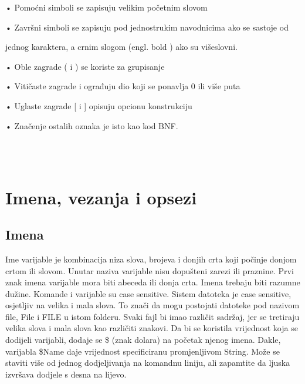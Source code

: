 \documentclass[11pt]{book}
\begin{document}
• Pomoćni simboli se zapisuju velikim početnim slovom

• Završni simboli se zapisuju pod jednostrukim navodnicima ako se sastoje od

jednog karaktera, a crnim slogom (engl. bold ) ako su višeslovni. 

• Oble zagrade ( i ) se koriste za grupisanje

• Vitičaste zagrade { i } ograđuju dio koji se ponavlja 0 ili više puta

• Uglaste zagrade [ i ] opisuju opcionu konstrukciju

• Značenje ostalih oznaka je isto kao kod BNF.\\\\

\\


\section{Imena, vezanja i opsezi}

\subsection{Imena}
Ime varijable je kombinacija niza slova, brojeva i donjih crta koji počinje donjom crtom ili slovom. 
Unutar naziva varijable nisu dopušteni zarezi ili praznine. Prvi znak imena varijable mora biti abeceda ili donja crta. Imena trebaju biti razumne dužine.
Komande i varijable su case sensitive. Sistem datoteka je case sensitive, osjetljiv na velika i mala slova. To znači da mogu postojati datoteke pod nazivom file, File i FILE u istom folderu. Svaki fajl bi imao različit sadržaj, jer se tretiraju velika slova i mala slova kao različiti znakovi.  
Da bi se koristila vrijednost koja se dodijeli varijabli, dodaje se \$ (znak dolara) na početak njenog imena. Dakle, varijabla \$Name daje vrijednost specificiranu promjenljivom String. Može se staviti više od jednog dodjeljivanja na komandnu liniju, ali zapamtite da ljuska izvršava dodjele s desna na lijevo.
\end{document}
